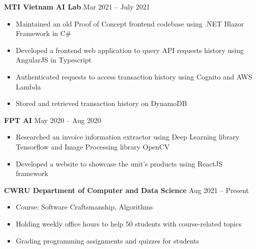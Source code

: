 \documentclass[11pt]{article}
\begin{document}
\hspace{10pt}\textbf{MTI Vietnam AI Lab} \hfill {\small Mar 2021 -- July 2021} \\
  \vspace{-2pt}
  \begin{itemize}[leftmargin=31pt]
  \vspace{-10pt}
    \setlength\itemsep{-5pt}
      \item {\small Maintained an old Proof of Concept frontend codebase using .NET Blazor Framework in C\#}
      \item {\small Developed a frontend web application to query API requests history using AngularJS in Typescript}
      \item {\small Authenticated requests to access transaction history using Cognito and AWS Lambda}
      \item {\small Stored and retrieved transaction history on DynamoDB}
    \vspace{-7pt}
  \end{itemize}

\hspace{10pt}\textbf{FPT AI} \hfill {\small May 2020 -- Aug 2020} \\
  \vspace{-2pt}
  \begin{itemize}[leftmargin=31pt]
  \vspace{-10pt}
    \setlength\itemsep{-5pt}
      \item {\small Researched an invoice information extractor using Deep Learning library Tensorflow and Image Processing library OpenCV}
      \item {\small Developed a website to showcase the unit’s products using ReactJS framework}
    \vspace{-7pt}
  \end{itemize}
  
  \hspace{10pt}\textbf{CWRU Department of Computer and Data Science} \hfill {\small Aug 2021 -- Present} \\
  \vspace{-2pt}
  \begin{itemize}[leftmargin=31pt]
  \vspace{-10pt}
    \setlength\itemsep{-5pt}
      \item {\small Course: Software Craftsmanship, Algorithms}
      \item {\small Holding weekly office hours to help 50 students with course-related topics}
      \item {\small Grading programming assignments and quizzes for students}
      \vspace{-7pt}
  \end{itemize}
\end{document}
